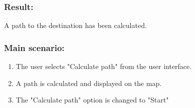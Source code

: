 \begin{framed}
	\subsubsection*{Result:}
	A path to the destination has been calculated.
	
	\subsubsection*{Main scenario:}
	\begin{enumerate}
		\item The user selects "Calculate path" from the user interface.
		\item A path is calculated and displayed on the map. 
		\item The "Calculate path" option is changed to "Start"
	\end{enumerate}	
\end{framed}	

